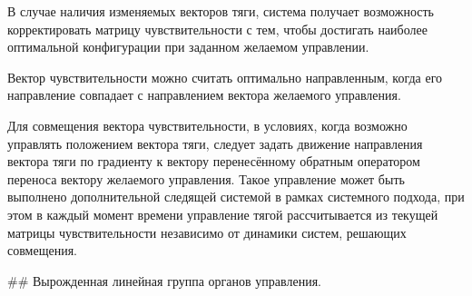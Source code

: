 В случае наличия изменяемых векторов тяги, система получает возможность корректировать матрицу чувствительности с тем, чтобы достигать наиболее оптимальной конфигурации при заданном желаемом управлении.

Вектор чувствительности можно считать оптимально направленным, когда его направление совпадает с направлением вектора желаемого управления. 

Для совмещения вектора чувствительности, в условиях, когда возможно управлять положением вектора тяги, следует задать движение направления вектора тяги по градиенту к вектору перенесённому обратным оператором переноса вектору желаемого управления. Такое управление может быть выполнено дополнительной следящей системой в рамках системного подхода, при этом в каждый момент времени управление тягой рассчитывается из текущей матрицы чувствительности независимо от динамики систем, решающих совмещения.

## Вырожденная линейная группа органов управления.



